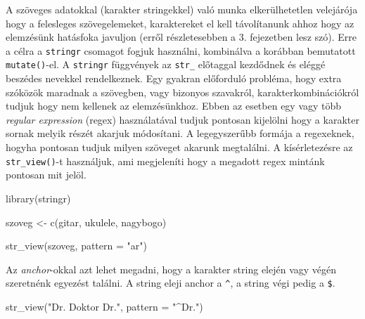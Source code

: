 \documentclass[
]{book}
\newenvironment{Shaded}{\begin{snugshade}}{\end{snugshade}}
\newcommand{\AttributeTok}[1]{\textcolor[rgb]{0.77,0.63,0.00}{#1}}
\newcommand{\FunctionTok}[1]{\textcolor[rgb]{0.00,0.00,0.00}{#1}}
\newcommand{\NormalTok}[1]{#1}
\newcommand{\OtherTok}[1]{\textcolor[rgb]{0.56,0.35,0.01}{#1}}
\newcommand{\StringTok}[1]{\textcolor[rgb]{0.31,0.60,0.02}{#1}}
\begin{document}
A szöveges adatokkal (karakter stringekkel) való munka elkerülhetetlen
velejárója hogy a felesleges szövegelemeket, karaktereket el kell
távolítanunk ahhoz hogy az elemzésünk hatásfoka javuljon (erről
részletesebben a 3. fejezetben lesz szó). Erre a célra a
\texttt{stringr} csomagot fogjuk használni, kombinálva a korábban
bemutatott \texttt{mutate()}-el. A \texttt{stringr} függvények az
\texttt{str\_} előtaggal kezdődnek és eléggé beszédes nevekkel
rendelkeznek. Egy gyakran előforduló probléma, hogy extra szóközök
maradnak a szövegben, vagy bizonyos szavakról, karakterkombinációkról
tudjuk hogy nem kellenek az elemzésünkhoz. Ebben az esetben egy vagy
több \emph{regular expression} (regex) használatával tudjuk pontosan
kijelölni hogy a karakter sornak melyik részét akarjuk módosítani. A
legegyszerűbb formája a regexeknek, hogyha pontosan tudjuk milyen
szöveget akarunk megtalálni. A kísérletezésre az \texttt{str\_view()}-t
használjuk, ami megjeleníti hogy a megadott regex mintánk pontosan mit
jelöl.

\begin{Shaded}
\begin{Highlighting}[]
\FunctionTok{library}\NormalTok{(stringr)}
\end{Highlighting}
\end{Shaded}

\begin{Shaded}
\begin{Highlighting}[]
\NormalTok{szoveg }\OtherTok{\textless{}{-}} \FunctionTok{c}\NormalTok{(}\StringTok{\textquotesingle{}gitar\textquotesingle{}}\NormalTok{, }\StringTok{\textquotesingle{}ukulele\textquotesingle{}}\NormalTok{, }\StringTok{\textquotesingle{}nagybogo\textquotesingle{}}\NormalTok{)}

\FunctionTok{str\_view}\NormalTok{(szoveg, }\AttributeTok{pattern =} \StringTok{"ar"}\NormalTok{)}
\end{Highlighting}
\end{Shaded}

\hypertarget{htmlwidget-0fbfe25d961db4d1f63a}{}

Az \emph{anchor}-okkal azt lehet megadni, hogy a karakter string elején
vagy végén szeretnénk egyezést találni. A string eleji anchor a
\texttt{\^{}}, a string végi pedig a \texttt{\$}.

\begin{Shaded}
\begin{Highlighting}[]
\FunctionTok{str\_view}\NormalTok{(}\StringTok{"Dr. Doktor Dr."}\NormalTok{, }\AttributeTok{pattern =} \StringTok{"\^{}Dr."}\NormalTok{)}
\end{Highlighting}
\end{Shaded}
\end{document}
